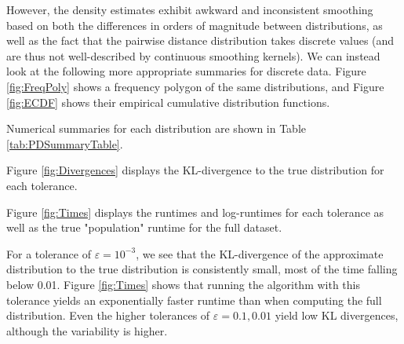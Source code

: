 \documentclass{article}
\begin{document}
However, the density estimates exhibit awkward and inconsistent smoothing based on both the differences in orders of magnitude between distributions, as well as the fact that the pairwise distance distribution takes discrete values (and are thus not well-described by continuous smoothing kernels).
We can instead look at the following more appropriate summaries for discrete data.
Figure \ref{fig:FreqPoly} shows a frequency polygon of the same distributions, and Figure \ref{fig:ECDF} shows their empirical cumulative distribution functions.


Numerical summaries for each distribution are shown in Table \ref{tab:PDSummaryTable}.

Figure \ref{fig:Divergences} displays the KL-divergence to the true distribution for each tolerance.
\begin{figure}

\end{figure}
Figure \ref{fig:Times} displays the runtimes and log-runtimes for each tolerance as well as the true "population" runtime for the full dataset.


For a tolerance of $\varepsilon = 10^{-3}$, we see that the KL-divergence of the approximate distribution to the true distribution is consistently small, most of the time falling below 0.01. 
Figure \ref{fig:Times} shows that running the algorithm with this tolerance yields an exponentially faster runtime than when computing the full distribution.  
Even the higher tolerances of $\varepsilon = 0.1, 0.01$ yield low KL divergences, although the variability is higher.
\end{document}
